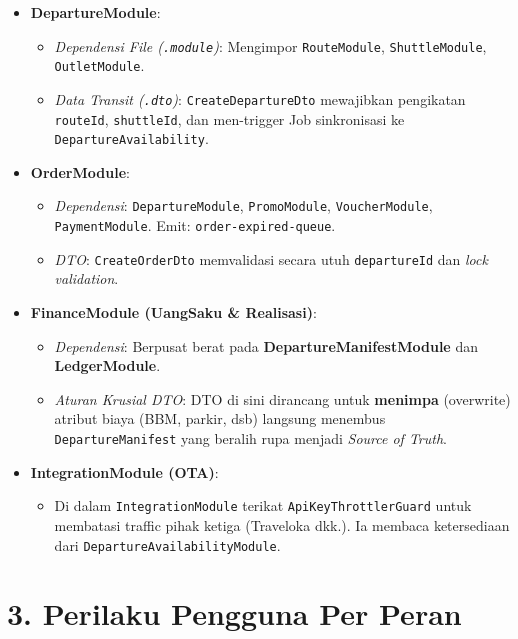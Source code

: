 \documentclass[11pt,a4paper]{article}
\begin{document}
\begin{itemize}
    \item \textbf{DepartureModule}:
    \begin{itemize}
        \item \textit{Dependensi File (\texttt{.module})}: Mengimpor \texttt{RouteModule}, \texttt{ShuttleModule}, \texttt{OutletModule}.
        \item \textit{Data Transit (\texttt{.dto})}: \texttt{CreateDepartureDto} mewajibkan pengikatan \texttt{routeId}, \texttt{shuttleId}, dan men-trigger Job sinkronisasi ke \texttt{DepartureAvailability}.
    \end{itemize}
    \item \textbf{OrderModule}:
    \begin{itemize}
        \item \textit{Dependensi}: \texttt{DepartureModule}, \texttt{PromoModule}, \texttt{VoucherModule}, \texttt{PaymentModule}. Emit: \texttt{order-expired-queue}.
        \item \textit{DTO}: \texttt{CreateOrderDto} memvalidasi secara utuh \texttt{departureId} dan \textit{lock validation}.
    \end{itemize}
    \item \textbf{FinanceModule (UangSaku \& Realisasi)}:
    \begin{itemize}
        \item \textit{Dependensi}: Berpusat berat pada \textbf{DepartureManifestModule} dan \textbf{LedgerModule}.
        \item \textit{Aturan Krusial DTO}: DTO di sini dirancang untuk \textbf{menimpa} (overwrite) atribut biaya (BBM, parkir, dsb) langsung menembus \texttt{DepartureManifest} yang beralih rupa menjadi \textit{Source of Truth}. 
    \end{itemize}
    \item \textbf{IntegrationModule (OTA)}:
    \begin{itemize}
        \item Di dalam \texttt{IntegrationModule} terikat \texttt{ApiKeyThrottlerGuard} untuk membatasi traffic pihak ketiga (Traveloka dkk.). Ia membaca ketersediaan dari \texttt{DepartureAvailabilityModule}.
    \end{itemize}
\end{itemize}

\clearpage
\section{3. Perilaku Pengguna Per Peran}
\end{document}
